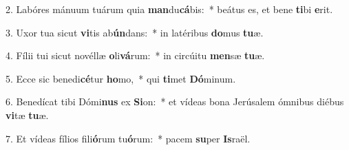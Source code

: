 2. Labóres mánuum tuárum quia \textbf{man}du\textbf{cá}bis:~*  beátus es, et bene \textbf{ti}bi \textbf{e}rit.\

3. Uxor tua sicut \textbf{vi}tis ab\textbf{ún}dans:~*  in latéribus \textbf{do}mus \textbf{tu}æ.\

4. Fílii tui sicut novéllæ \textbf{o}li\textbf{vá}rum:~*  in circúitu \textbf{men}sæ \textbf{tu}æ.\

5. Ecce sic benedi\textbf{cé}tur \textbf{ho}mo,~*  qui \textbf{ti}met \textbf{Dó}minum.\

6. Benedícat tibi Dómi\textbf{nus} ex \textbf{Si}on:~*  et vídeas bona Jerúsalem ómnibus diébus \textbf{vi}tæ \textbf{tu}æ.\

7. Et vídeas fílios fili\textbf{ó}rum tu\textbf{ó}rum:~*  pacem \textbf{su}per \textbf{Is}raël.\

